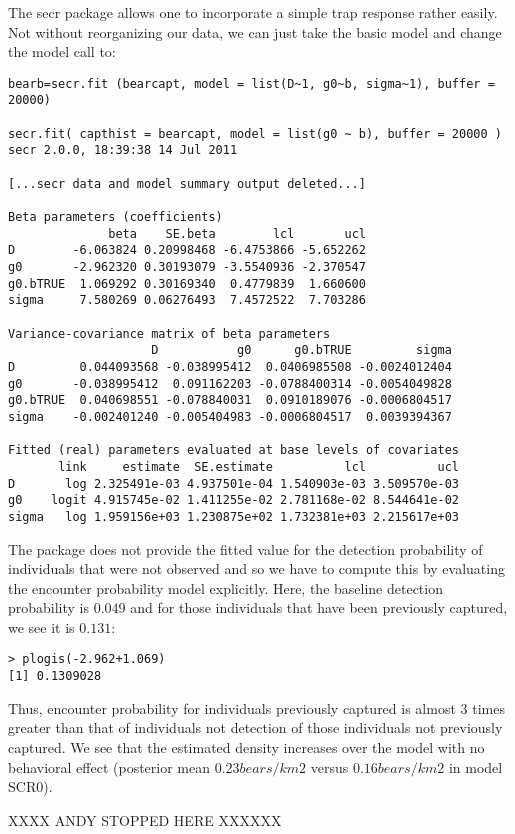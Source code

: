 The secr package allows one to incorporate a simple trap response
rather easily.  Not without reorganizing our data, we can just take
the basic model and change the model call to:
{\small
\begin{verbatim}
bearb=secr.fit (bearcapt, model = list(D~1, g0~b, sigma~1), buffer = 20000)

secr.fit( capthist = bearcapt, model = list(g0 ~ b), buffer = 20000 )
secr 2.0.0, 18:39:38 14 Jul 2011

[...secr data and model summary output deleted...]

Beta parameters (coefficients) 
              beta    SE.beta        lcl       ucl
D        -6.063824 0.20998468 -6.4753866 -5.652262
g0       -2.962320 0.30193079 -3.5540936 -2.370547
g0.bTRUE  1.069292 0.30169340  0.4779839  1.660600
sigma     7.580269 0.06276493  7.4572522  7.703286

Variance-covariance matrix of beta parameters 
                    D           g0      g0.bTRUE         sigma
D         0.044093568 -0.038995412  0.0406985508 -0.0024012404
g0       -0.038995412  0.091162203 -0.0788400314 -0.0054049828
g0.bTRUE  0.040698551 -0.078840031  0.0910189076 -0.0006804517
sigma    -0.002401240 -0.005404983 -0.0006804517  0.0039394367

Fitted (real) parameters evaluated at base levels of covariates 
       link     estimate  SE.estimate          lcl          ucl
D       log 2.325491e-03 4.937501e-04 1.540903e-03 3.509570e-03
g0    logit 4.915745e-02 1.411255e-02 2.781168e-02 8.544641e-02
sigma   log 1.959156e+03 1.230875e+02 1.732381e+03 2.215617e+03
\end{verbatim}
} 
The package \secr does not provide the fitted value for the detection
probability of individuals that were not observed and so we have to
compute this by evaluating the encounter probability model explicitly.
Here, the baseline
detection probability is $0.049$ and for those individuals that have
been previously captured, we see it is $0.131$:
\begin{verbatim}
> plogis(-2.962+1.069)
[1] 0.1309028
\end{verbatim}
Thus, encounter probability for individuals previously captured is
almost 3 times greater than that of individuals not 
 detection of those individuals
not previously captured.  We see that the 
estimated density increases over the model with no behavioral effect
(posterior mean $0.23
bears/km2$ versus $0.16 bears/km2$ in model SCR0).

XXXX ANDY STOPPED HERE XXXXXX

